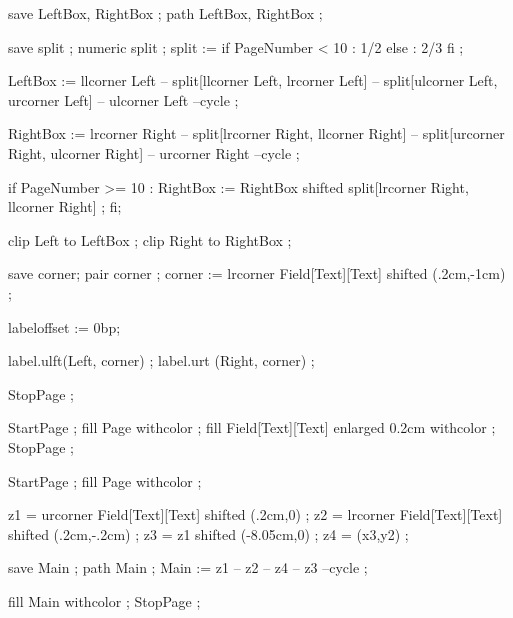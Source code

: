 save LeftBox, RightBox ;
path LeftBox, RightBox ;

save split ; numeric split ;
split := if PageNumber < 10 : 1/2 else : 2/3 fi  ;

LeftBox := llcorner Left -- split[llcorner Left, lrcorner Left]
           -- split[ulcorner Left, urcorner Left] -- ulcorner Left --cycle ;
           
RightBox := lrcorner Right -- split[lrcorner Right, llcorner Right]
           -- split[urcorner Right, ulcorner Right] -- urcorner Right --cycle ;

if PageNumber >= 10 :
RightBox := RightBox shifted  split[lrcorner Right, llcorner Right] ;
fi;

clip Left  to LeftBox  ;
clip Right to RightBox ;

save corner; pair corner ;
corner := lrcorner Field[Text][Text] shifted (.2cm,-1cm) ; %

labeloffset := 0bp;

label.ulft(Left,  corner) ;
label.urt (Right, corner) ;

StopPage ;
\stopuseMPgraphic

                       
StartPage ;
fill Page withcolor  ;
fill Field[Text][Text] enlarged 0.2cm
     withcolor  ;
StopPage ;
\stopuniqueMPgraphic 

StartPage ;
fill Page withcolor  ;

z1 = urcorner Field[Text][Text] shifted (.2cm,0) ;
z2 = lrcorner Field[Text][Text] shifted (.2cm,-.2cm) ;
z3 = z1 shifted (-8.05cm,0) ;
z4 = (x3,y2) ;

save Main ;
path Main ;
Main := z1 -- z2 -- z4 -- z3 --cycle ;

fill Main withcolor  ;
StopPage ;
\stopuniqueMPgraphic






